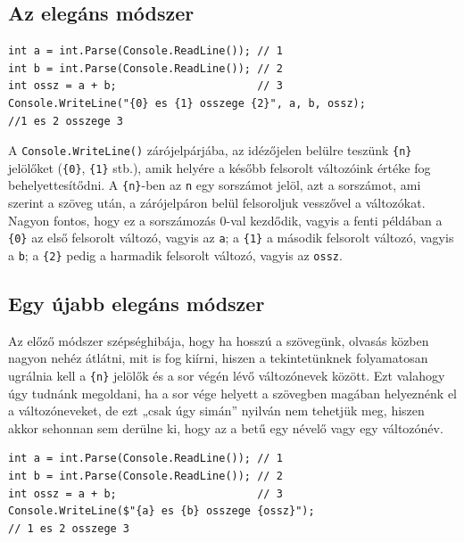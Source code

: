 \documentclass[a4paper]{article}
\begin{document}
\subsection{Az elegáns módszer}
\begin{lstlisting}[caption=Változók értékének kiírása -- elegánsan, label=lst:writeVarsElegant]
int a = int.Parse(Console.ReadLine()); // 1
int b = int.Parse(Console.ReadLine()); // 2
int ossz = a + b;                      // 3
Console.WriteLine("{0} es {1} osszege {2}", a, b, ossz);
//1 es 2 osszege 3
\end{lstlisting}

A \lstinline{Console.WriteLine()} zárójelpárjába, az idézőjelen belülre teszünk \lstinline!{n}! jelölőket (\lstinline!{0}!, \lstinline!{1}! stb.), amik helyére a később felsorolt változóink értéke fog behelyettesítődni. A \lstinline!{n}!-ben az \lstinline{n} egy sorszámot jelöl, azt a sorszámot, ami szerint a szöveg után, a zárójelpáron belül felsoroljuk vesszővel a változókat. Nagyon fontos, hogy ez a sorszámozás 0-val kezdődik, vagyis a fenti példában a \lstinline!{0}! az első felsorolt változó, vagyis az \lstinline{a}; a \lstinline!{1}! a második felsorolt változó, vagyis a \lstinline{b}; a \lstinline!{2}! pedig a harmadik felsorolt változó, vagyis az \lstinline{ossz}.

\subsection{Egy újabb elegáns módszer}
Az előző módszer szépséghibája, hogy ha hosszú a szövegünk, olvasás közben nagyon nehéz átlátni, mit is fog kiírni, hiszen a tekintetünknek folyamatosan ugrálnia kell a \lstinline!{n}! jelölők és a sor végén lévő változónevek között. Ezt valahogy úgy tudnánk megoldani, ha a sor vége helyett a szövegben magában helyeznénk el a változóneveket, de ezt „csak úgy simán” nyilván nem tehetjük meg, hiszen akkor sehonnan sem derülne ki, hogy az a betű egy névelő vagy egy változónév.

\begin{lstlisting}[caption=Változók értékének kiírása -- elegánsan 2., label=lst:writeVarsElegant2]
int a = int.Parse(Console.ReadLine()); // 1
int b = int.Parse(Console.ReadLine()); // 2
int ossz = a + b;                      // 3
Console.WriteLine($"{a} es {b} osszege {ossz}");
// 1 es 2 osszege 3
\end{lstlisting}

\newcommand{\within}[1]{#1}
\end{document}
